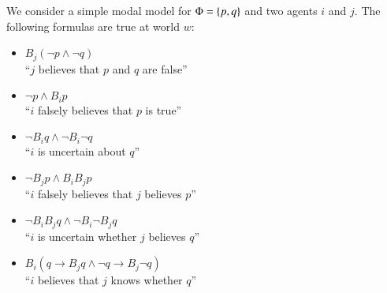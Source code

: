 \documentclass[nobib,nofonts]{tufte-handout}
\newcommand{\Props}{\ensuremath{\Phi}}
\newcommand{\ra}{\ensuremath{\rightarrow}}
\newcommand{\Bel}{\ensuremath{B}}
\begin{document}
\begin{example}
  \label{example:simple_modal_modal}
  We consider a simple modal model for $\Props = \set{p,q}$ and two
  agents $i$ and $j$. The following formulas are true at world $w$:

  \begin{minipage}[t]{0.4\linewidth}
    \vspace{0em}
    \begin{itemize}
    \item $\Bel_j (\neg p \wedge \neg q)$  \\ ``$j$ believes that $p$ and $q$ are false''
    \item $\neg p \wedge \Bel_i p$  \\ ``$i$ falsely believes that $p$ is true''
    \item $\neg \Bel_i q \wedge \neg \Bel_i \neg q$ \\ ``$i$ is uncertain about $q$''
    \item $\neg \Bel_j p \wedge \Bel_i \Bel_j p$ \\ ``$i$ falsely believes that $j$ believes $p$''
    \item $\neg \Bel_i \Bel_j q \wedge \neg \Bel_i \neg \Bel_j q$ \\ ``$i$ is uncertain whether $j$ believes $q$''
    \item $\Bel_i (q \ra \Bel_j q \wedge \neg q \ra \Bel_j \neg q)$ \\ ``$i$ believes that $j$ knows whether $q$''
    \end{itemize}
  \end{minipage}
  \begin{minipage}[t]{0.6\linewidth}
    \vspace{0em}
    \begin{center}
\end{center}
\end{minipage}
\end{example}
\end{document}
